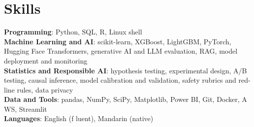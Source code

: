 \documentclass[letterpaper,11pt]{article}
\begin{document}
\section{\textbf{Skills}}
 \begin{itemize}[leftmargin=0.15in, label={}]
    \small{\item{
     \textbf{Programming}{: Python, SQL, R, Linux shell} \\
     \textbf{Machine Learning and AI}{: scikit-learn, XGBoost, LightGBM, PyTorch, Hugging Face Transformers, generative AI and LLM evaluation, RAG, model deployment and monitoring} \\
     \textbf{Statistics and Responsible AI}{: hypothesis testing, experimental design, A/B testing, causal inference, model calibration and validation, safety rubrics and red-line rules, data privacy} \\
     \textbf{Data and Tools}{: pandas, NumPy, SciPy, Matplotlib, Power BI, Git, Docker, A\kern0pt WS, Streamlit} \\
     \textbf{Languages}{: English (f\kern0pt luent), Mandarin (native)}}}

 \end{itemize}
\end{document}
